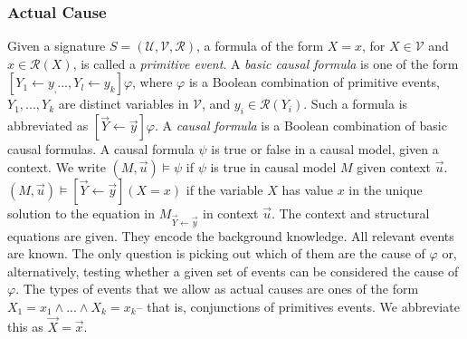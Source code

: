 \begin{center}
\end{center}

\subsubsection{Actual Cause}
Given a signature $S= (\mathcal{U},\mathcal{V},\mathcal{R})$, a formula of the form $X =x$, for $X \in \mathcal{V}$ and $x \in \mathcal{R}(X)$, is called a \textit{primitive event}.
A \textit{basic causal formula} is one of the form $[Y_1 \leftarrow y_, ..., Y_l\leftarrow y_k]\varphi$, where $\varphi$ is a Boolean combination of primitive events, $Y_1,...,Y_k$ are distinct variables in $\mathcal{V}$, and $y_i \in \mathcal{R}(Y_i)$.
Such a formula is abbreviated as $[\vec{Y}\leftarrow\vec{y}]\varphi$.
A \textit{causal formula} is a Boolean combination of basic causal formulas.
A causal formula $\psi$ is true or false in a causal model, given a context.
We write $(M,\vec u)\models \psi$ if $\psi$ is true in causal model $M$ given context $\vec u$.
$(M,\vec u)\models [\vec Y\leftarrow \vec y](X=x)$ if the variable $X$ has value $x$ in the unique solution to the equation in $M_{\vec{Y} \leftarrow \vec{y}}$ in context $\vec u$.
The context and structural equations are given.
They encode the background knowledge.
All relevant events are known.
The only question is picking out which of them are the cause of $\varphi$ or, alternatively, testing whether a given set of events can be considered the cause of $\varphi$.
The types of events that we allow as actual causes are ones of the form $X_1 = x_1 \wedge ... \wedge X_k=x_k$-- that is, conjunctions of primitives events.
We abbreviate this as $\vec X = \vec x$.
